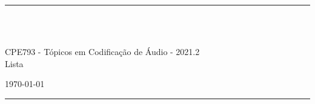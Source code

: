 \fancyhead[C]{}
\hrule \medskip
\begin{minipage}{0.295\textwidth} 
\raggedright
\footnotesize
\yourname \hfill\\ 
\yournetid \hfill\\ 
\youremail
\end{minipage}
\begin{minipage}{0.4\textwidth} 
\centering 
\large 
CPE793 - Tópicos em Codificação de Áudio - 2021.2\\ 
\normalsize 
Lista \assignmentnumber\\ 
\end{minipage}
\begin{minipage}{0.295\textwidth} 
\raggedleft
\today\hfill\\
\end{minipage}
\medskip\hrule 
\bigskip
